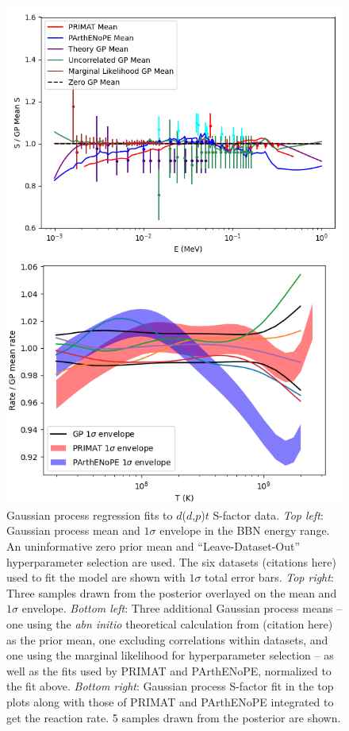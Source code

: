 \documentclass[%
 reprint,
superscriptaddress,
nofootinbib,
 amsmath,amssymb,
 aps,
 pra,
]{revtex4-2}
\begin{document}
\begin{figure}
\begin{minipage}{.48\textwidth}
		\includegraphics[width=\linewidth]{Figures/ddtp_S_comp.png}	
	\end{minipage}
	\hspace{0mm}
	\begin{minipage}{.48\textwidth}
    		\centering
		\includegraphics[width=\linewidth]{Figures/ddtp_rate.png}	
	\end{minipage}
    	\caption{Gaussian process regression fits to $d$($d$,$p$)$t$ S-factor data. \textit{Top left}: Gaussian process mean and $1\sigma$ envelope in the BBN energy range. An uninformative zero prior mean and ``Leave-Dataset-Out'' hyperparameter selection are used. The six datasets (citations here) used to fit the model are shown with $1\sigma$ total error bars. \textit{Top right}: Three samples drawn from the posterior overlayed on the mean and $1\sigma$ envelope. \textit{Bottom left}: Three additional Gaussian process means -- one using the \textit{abn initio} theoretical calculation from (citation here) as the prior mean, one excluding correlations within datasets, and one using the marginal likelihood for hyperparameter selection -- as well as the fits used by PRIMAT and PArthENoPE, normalized to the fit above. \textit{Bottom right}: Gaussian process S-factor fit in the top plots along with those of PRIMAT and PArthENoPE integrated to get the reaction rate. 5 samples drawn from the posterior are shown. }
\end{figure}
\end{document}
